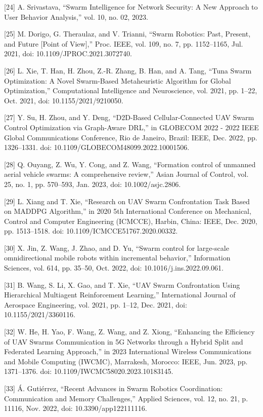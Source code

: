 [24] A. Srivastava, “Swarm Intelligence for Network Security: A New Approach to User Behavior Analysis,” vol. 10, no. 02, 2023.


[25] M. Dorigo, G. Theraulaz, and V. Trianni, “Swarm Robotics: Past, Present, and Future [Point of View],” Proc. IEEE, vol. 109, no. 7, pp. 1152–1165, Jul. 2021, doi: 10.1109/JPROC.2021.3072740.


[26] L. Xie, T. Han, H. Zhou, Z.-R. Zhang, B. Han, and A. Tang, “Tuna Swarm Optimization: A Novel Swarm-Based Metaheuristic Algorithm for Global Optimization,” Computational Intelligence and Neuroscience, vol. 2021, pp. 1–22, Oct. 2021, doi: 10.1155/2021/9210050.


[27] Y. Su, H. Zhou, and Y. Deng, “D2D-Based Cellular-Connected UAV Swarm Control Optimization via Graph-Aware DRL,” in GLOBECOM 2022 - 2022 IEEE Global Communications Conference, Rio de Janeiro, Brazil: IEEE, Dec. 2022, pp. 1326–1331. doi: 10.1109/GLOBECOM48099.2022.10001506.


[28] Q. Ouyang, Z. Wu, Y. Cong, and Z. Wang, “Formation control of unmanned aerial vehicle swarms: A comprehensive review,” Asian Journal of Control, vol. 25, no. 1, pp. 570–593, Jan. 2023, doi: 10.1002/asjc.2806.


[29] L. Xiang and T. Xie, “Research on UAV Swarm Confrontation Task Based on MADDPG Algorithm,” in 2020 5th International Conference on Mechanical, Control and Computer Engineering (ICMCCE), Harbin, China: IEEE, Dec. 2020, pp. 1513–1518. doi: 10.1109/ICMCCE51767.2020.00332.


[30] X. Jin, Z. Wang, J. Zhao, and D. Yu, “Swarm control for large-scale omnidirectional mobile robots within incremental behavior,” Information Sciences, vol. 614, pp. 35–50, Oct. 2022, doi: 10.1016/j.ins.2022.09.061.


[31] B. Wang, S. Li, X. Gao, and T. Xie, “UAV Swarm Confrontation Using Hierarchical Multiagent Reinforcement Learning,” International Journal of Aerospace Engineering, vol. 2021, pp. 1–12, Dec. 2021, doi: 10.1155/2021/3360116.


[32] W. He, H. Yao, F. Wang, Z. Wang, and Z. Xiong, “Enhancing the Efficiency of UAV Swarms Communication in 5G Networks through a Hybrid Split and Federated Learning Approach,” in 2023 International Wireless Communications and Mobile Computing (IWCMC), Marrakesh, Morocco: IEEE, Jun. 2023, pp. 1371–1376. doi: 10.1109/IWCMC58020.2023.10183145.


[33] Á. Gutiérrez, “Recent Advances in Swarm Robotics Coordination: Communication and Memory Challenges,” Applied Sciences, vol. 12, no. 21, p. 11116, Nov. 2022, doi: 10.3390/app122111116.



